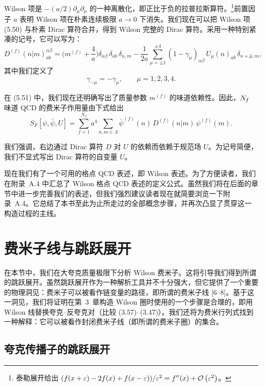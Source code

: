 Wilson 项是 $-(a/2)\partial_\mu\partial_\mu$ 的一种离散化，即正比于负的拉普拉斯算符。\footnote{泰勒展开给出 $(f(x + \varepsilon) - 2f(x) + f(x - \varepsilon))/\varepsilon^2 = f''(x) + \mathcal{O}\left(\varepsilon^2\right)$。}前置因子 $a$ 表明 Wilson 项在朴素连续极限 $a \to 0$ 下消失。我们现在可以把 Wilson 项 (5.50) 与朴素 Dirac 算符合并，得到 Wilson 完整的 Dirac 算符。采用一种特别紧凑的记号，它可以写为：
\begin{equation}
  D^{(f)}(n|m)^{\alpha\beta}_{ab}
    = \Big(m^{(f)} + \frac{4}{a}\Big)\delta_{\alpha\beta}\,\delta_{ab}\,\delta_{n,m}
    - \frac{1}{2a}\sum_{\mu=\pm1}^{\pm4}(1-\gamma_\mu)_{\alpha\beta}\,
      U_\mu(n)_{ab}\,\delta_{n+\hat{\mu},m} ,
\end{equation}
其中我们定义了
\begin{equation}
  \gamma_{-\mu} = -\gamma_\mu, \qquad \mu = 1, 2, 3, 4 .
\end{equation}

在 (5.51) 中，我们现在还明确写出了质量参数 $m^{(f)}$ 的味道依赖性。因此，$N_f$ 味道 QCD 的费米子作用量由下式给出
\begin{equation}
  S_F[\psi,\bar{\psi},U] = \sum_{f=1}^{N_f}a^4\sum_{n,m\in\Lambda}
    \bar{\psi}^{(f)}(n)\,D^{(f)}(n|m)\,\psi^{(f)}(m) .
\end{equation}

我们强调，右边通过 Dirac 算符 $D$ 对 $U$ 的依赖而依赖于规范场 $U$。为记号简便，我们不显式写出 Dirac 算符的自变量 $U$。

现在我们有了一个可用的格点 QCD 表述，即 Wilson 表述。为了方便读者，我们在附录~A.4 中汇总了 Wilson 格点 QCD 表述的定义公式。虽然我们将在后面的章节中进一步完善我们的表述，但我们强烈建议读者现在就简要浏览一下附录~A.4。它总结了本书至此为止所走过的全部概念步骤，并再次凸显了贯穿这一构造过程的主线。

\section{费米子线与跳跃展开}

在本节中，我们在大夸克质量极限下分析 Wilson 费米子。这将引导我们得到所谓的跳跃展开。虽然跳跃展开作为一种解析工具并不十分强大，但它提供了一个重要的物理洞见：费米子可以被看作链变量的路径，即所谓的费米子线 [6--8]。基于这一洞见，我们将证明在第~3~章构造 Wilson 圈时使用的一个步骤是合理的，即用 Wilson 线替换夸克--反夸克对（比较 (3.57)--(3.47)）。我们还将为费米行列式找到一种解释：它可以被看作封闭费米子线（即所谓的费米子圈）的集合。

\subsection{夸克传播子的跳跃展开}

